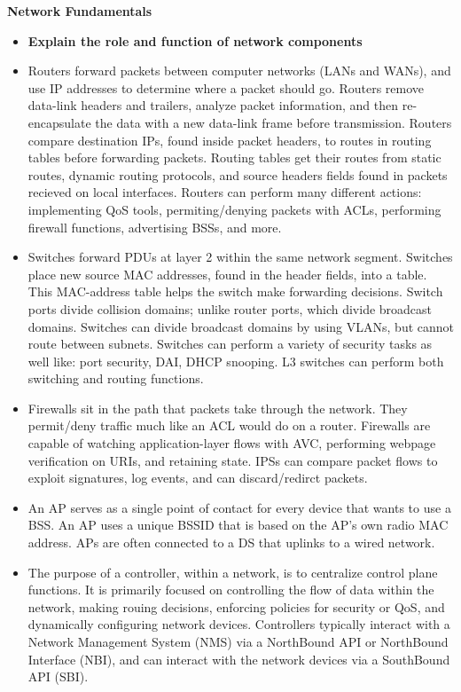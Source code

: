 \documentclass{article}
\begin{document}
\begin{flushleft}\textbf{Network Fundamentals}\end{flushleft}
\begin{itemize}
  \item \textbf{Explain the role and function of network components}
  	\item[] Routers forward packets between computer networks (LANs and WANs), and use IP addresses to determine where a packet should go. Routers remove data-link headers and trailers, analyze packet information, and then re-encapsulate the data with a new data-link frame before transmission. Routers compare destination IPs, found inside packet headers, to routes in routing tables before forwarding packets. Routing tables get their routes from static routes, dynamic routing protocols, and source headers fields found in packets recieved on local interfaces. Routers can perform many different actions: implementing QoS tools, permiting/denying packets with ACLs, performing firewall functions, advertising BSSs, and more. 
	\item[] Switches forward PDUs at layer 2 within the same network segment. Switches place new source MAC addresses, found in the header fields, into a table. This MAC-address table helps the switch make forwarding decisions. Switch ports divide collision domains; unlike router ports, which divide broadcast domains. Switches can divide broadcast domains by using VLANs, but cannot route between subnets. Switches can perform a variety of security tasks as well like: port security, DAI, DHCP snooping. L3 switches can perform both switching and routing functions.
	\item[] Firewalls sit in the path that packets take through the network. They permit/deny traffic much like an ACL would do on a router. Firewalls are capable of watching application-layer flows with AVC, performing webpage verification on URIs, and retaining state. IPSs can compare packet flows to exploit signatures, log events, and can discard/redirct packets.
	\item[] An AP serves as a single point of contact for every device that wants to use a BSS. An AP uses a unique BSSID that is based on the AP's own radio MAC address. APs are often connected to a DS that uplinks to a wired network.
 	\item[] The purpose of a controller, within a network, is to centralize control plane functions. It is primarily focused on controlling the flow of data within the network, making rouing decisions, enforcing policies for security or QoS, and dynamically configuring network devices. Controllers typically interact with a Network Management System (NMS) via a NorthBound API or NorthBound Interface (NBI), and can interact with the network devices via a SouthBound API (SBI).\\

\end{itemize}
\end{document}

